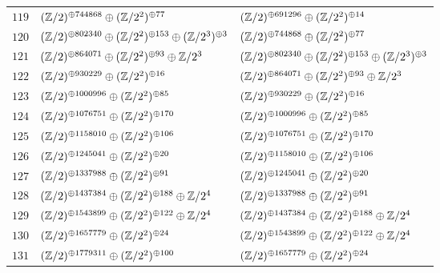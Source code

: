 \begin{supertabular}{|c|p{5.5cm}|p{5.5cm}|}
$119$%
&$(\mathbb{Z}/2)^{\oplus744868}\oplus(\mathbb{Z}/2^{2})^{\oplus77}$%
&$(\mathbb{Z}/2)^{\oplus691296}\oplus(\mathbb{Z}/2^{2})^{\oplus14}$\\

$120$%
&$(\mathbb{Z}/2)^{\oplus802340}\oplus(\mathbb{Z}/2^{2})^{\oplus153}\oplus(\mathbb{Z}/2^{3})^{\oplus3}$%
&$(\mathbb{Z}/2)^{\oplus744868}\oplus(\mathbb{Z}/2^{2})^{\oplus77}$\\

$121$%
&$(\mathbb{Z}/2)^{\oplus864071}\oplus(\mathbb{Z}/2^{2})^{\oplus93}\oplus\mathbb{Z}/2^{3}$%
&$(\mathbb{Z}/2)^{\oplus802340}\oplus(\mathbb{Z}/2^{2})^{\oplus153}\oplus(\mathbb{Z}/2^{3})^{\oplus3}$\\

$122$%
&$(\mathbb{Z}/2)^{\oplus930229}\oplus(\mathbb{Z}/2^{2})^{\oplus16}$%
&$(\mathbb{Z}/2)^{\oplus864071}\oplus(\mathbb{Z}/2^{2})^{\oplus93}\oplus\mathbb{Z}/2^{3}$\\

$123$%
&$(\mathbb{Z}/2)^{\oplus1000996}\oplus(\mathbb{Z}/2^{2})^{\oplus85}$%
&$(\mathbb{Z}/2)^{\oplus930229}\oplus(\mathbb{Z}/2^{2})^{\oplus16}$\\

$124$%
&$(\mathbb{Z}/2)^{\oplus1076751}\oplus(\mathbb{Z}/2^{2})^{\oplus170}$%
&$(\mathbb{Z}/2)^{\oplus1000996}\oplus(\mathbb{Z}/2^{2})^{\oplus85}$\\

$125$%
&$(\mathbb{Z}/2)^{\oplus1158010}\oplus(\mathbb{Z}/2^{2})^{\oplus106}$%
&$(\mathbb{Z}/2)^{\oplus1076751}\oplus(\mathbb{Z}/2^{2})^{\oplus170}$\\

$126$%
&$(\mathbb{Z}/2)^{\oplus1245041}\oplus(\mathbb{Z}/2^{2})^{\oplus20}$%
&$(\mathbb{Z}/2)^{\oplus1158010}\oplus(\mathbb{Z}/2^{2})^{\oplus106}$\\

$127$%
&$(\mathbb{Z}/2)^{\oplus1337988}\oplus(\mathbb{Z}/2^{2})^{\oplus91}$%
&$(\mathbb{Z}/2)^{\oplus1245041}\oplus(\mathbb{Z}/2^{2})^{\oplus20}$\\

$128$%
&$(\mathbb{Z}/2)^{\oplus1437384}\oplus(\mathbb{Z}/2^{2})^{\oplus188}\oplus\mathbb{Z}/2^{4}$%
&$(\mathbb{Z}/2)^{\oplus1337988}\oplus(\mathbb{Z}/2^{2})^{\oplus91}$\\

$129$%
&$(\mathbb{Z}/2)^{\oplus1543899}\oplus(\mathbb{Z}/2^{2})^{\oplus122}\oplus\mathbb{Z}/2^{4}$%
&$(\mathbb{Z}/2)^{\oplus1437384}\oplus(\mathbb{Z}/2^{2})^{\oplus188}\oplus\mathbb{Z}/2^{4}$\\

$130$%
&$(\mathbb{Z}/2)^{\oplus1657779}\oplus(\mathbb{Z}/2^{2})^{\oplus24}$%
&$(\mathbb{Z}/2)^{\oplus1543899}\oplus(\mathbb{Z}/2^{2})^{\oplus122}\oplus\mathbb{Z}/2^{4}$\\

$131$%
&$(\mathbb{Z}/2)^{\oplus1779311}\oplus(\mathbb{Z}/2^{2})^{\oplus100}$%
&$(\mathbb{Z}/2)^{\oplus1657779}\oplus(\mathbb{Z}/2^{2})^{\oplus24}$\\


\end{supertabular}
